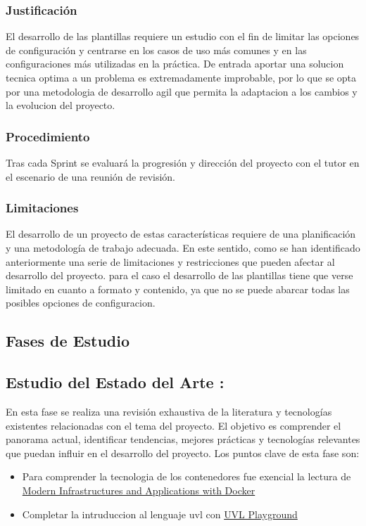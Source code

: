 \documentclass[12pt, a4paper, twoside]{article}
\begin{document}
\subsubsection{Justificación}

El desarrollo de las plantillas requiere un estudio con el fin de limitar las opciones de configuración y centrarse en los casos de uso más comunes y en las configuraciones más utilizadas en la práctica.
De entrada aportar una solucion tecnica optima a un problema es extremadamente improbable, por lo que se opta por una metodologia de desarrollo agil que permita la adaptacion a los cambios y la evolucion del proyecto.
\subsubsection{Procedimiento}
Tras cada Sprint se evaluará la progresión y dirección del proyecto con el tutor en el escenario de una reunión de revisión.
\subsubsection{Limitaciones}
El desarrollo de un proyecto de estas características requiere de una planificación y una metodología de trabajo adecuada.
En este sentido, como se han identificado anteriormente una serie de limitaciones y restricciones que pueden afectar al desarrollo del proyecto.
para el caso el desarrollo de las plantillas tiene que verse limitado en cuanto a formato y contenido, ya que no se puede abarcar todas las posibles opciones de configuracion.
\subsection{Fases de Estudio}
\subsection{Estudio del Estado del Arte :}
En esta fase se realiza una revisión exhaustiva de la literatura y tecnologías existentes relacionadas con el tema del 
proyecto. El objetivo es comprender el panorama actual, identificar tendencias, mejores prácticas y tecnologías 
relevantes que puedan influir en el desarrollo del proyecto. Los puntos clave de esta fase son:

\begin{itemize}
	\item Para comprender la tecnologia de los contenedores fue exencial la lectura de \href{https://www.oreilly.com/library/view/docker-certified-associate/9781839211898/c5ecd7bc-b7ed-4303-89a8-e487c6a220ed.xhtml#uuid-1a5da664-fb76-4e56-bdb0-83255dde9e78}{Modern Infrastructures and Applications with Docker} \cite{docker_certified_associate}
	\item Completar la intruduccion al lenguaje uvl con \href{https://uvl.uni-ulm.de/}{UVL Playground} \cite{uvl_playground}
\end{itemize}
\end{document}

